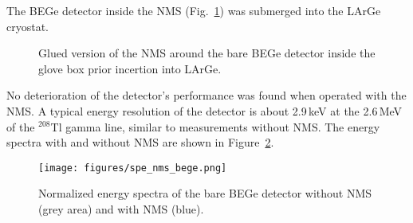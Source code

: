 \documentclass[twocolumn,epjc3]{svjour3}
\newcommand{\LArGe} {{{LArGe}\xspace}}
\newcommand{\I}[2]{$^{#1}$#2}
\begin{document}
The BEGe detector inside the NMS (Fig.~\ref{fig:nylon_glued}) was submerged into the \LArGe{} cryostat. 
%
\begin{figure}
  \begin{center}
    \begin{minipage}{0.49\linewidth}
    \end{minipage}
    \hfill
    \begin{minipage}{0.49\linewidth}
    \end{minipage}
    \caption{\label{fig:nylon_glued} Glued version of the NMS around the bare BEGe detector inside the glove box prior incertion into \LArGe{}.}
  \end{center}
\end{figure}
%
No deterioration of the detector's performance was found when operated with the NMS. A typical energy resolution of the detector is about 2.9\,keV at the 2.6\,MeV of the \I{208}{Tl} gamma line, similar to measurements without NMS. The energy spectra with and without NMS are shown in Figure~\ref{fig:spe_nms_bege}. 
%
\begin{figure}
\begin{center}
\texttt{[image: figures/spe\_nms\_bege.png]}
  \caption{\small\label{fig:spe_nms_bege} Normalized energy spectra of the bare BEGe detector without NMS (grey area) and with NMS (blue).  
}
\end{center}
\end{figure}
%
\end{document}
